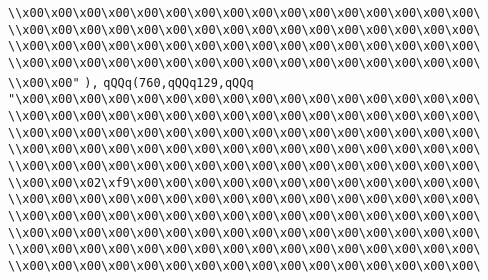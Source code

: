 \verb|\\x00\x00\x00\x00\x00\x00\x00\x00\x00\x00\x00\x00\x00\x00\x00\x00\|\newline
\verb|\\x00\x00\x00\x00\x00\x00\x00\x00\x00\x00\x00\x00\x00\x00\x00\x00\|\newline
\verb|\\x00\x00\x00\x00\x00\x00\x00\x00\x00\x00\x00\x00\x00\x00\x00\x00\|\newline
\verb|\\x00\x00\x00\x00\x00\x00\x00\x00\x00\x00\x00\x00\x00\x00\x00\x00\|\newline
\verb|\\x00\x00"|\newline
\verb|),|\newline
\verb|qQQq(760,qQQq129,qQQq|\newline
\verb|"\x00\x00\x00\x00\x00\x00\x00\x00\x00\x00\x00\x00\x00\x00\x00\x00\|\newline
\verb|\\x00\x00\x00\x00\x00\x00\x00\x00\x00\x00\x00\x00\x00\x00\x00\x00\|\newline
\verb|\\x00\x00\x00\x00\x00\x00\x00\x00\x00\x00\x00\x00\x00\x00\x00\x00\|\newline
\verb|\\x00\x00\x00\x00\x00\x00\x00\x00\x00\x00\x00\x00\x00\x00\x00\x00\|\newline
\verb|\\x00\x00\x00\x00\x00\x00\x00\x00\x00\x00\x00\x00\x00\x00\x00\x00\|\newline
\verb|\\x00\x00\x02\xf9\x00\x00\x00\x00\x00\x00\x00\x00\x00\x00\x00\x00\|\newline
\verb|\\x00\x00\x00\x00\x00\x00\x00\x00\x00\x00\x00\x00\x00\x00\x00\x00\|\newline
\verb|\\x00\x00\x00\x00\x00\x00\x00\x00\x00\x00\x00\x00\x00\x00\x00\x00\|\newline
\verb|\\x00\x00\x00\x00\x00\x00\x00\x00\x00\x00\x00\x00\x00\x00\x00\x00\|\newline
\verb|\\x00\x00\x00\x00\x00\x00\x00\x00\x00\x00\x00\x00\x00\x00\x00\x00\|\newline
\verb|\\x00\x00\x00\x00\x00\x00\x00\x00\x00\x00\x00\x00\x00\x00\x00\x00\|\newline
